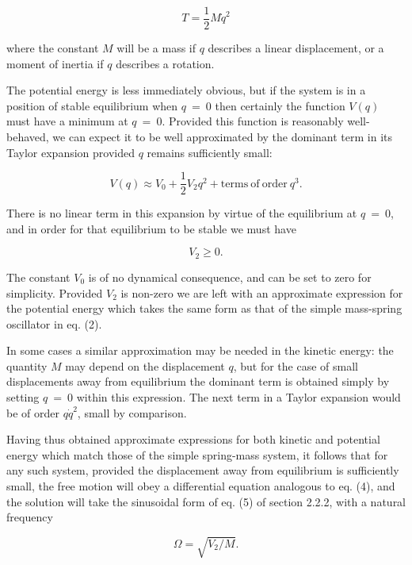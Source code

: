   $$T=\frac{1}{2} M \dot{q}^2 \tag{5}$$ 

  where the constant $M$ will be a mass if $q$ describes a linear displacement, 
  or a moment of inertia if $q$ describes a rotation. 

  The potential energy is less immediately obvious, but if the system is in a 
  position of stable equilibrium when $q~=~0$ then certainly the function 
  $V(q)$ must have a minimum at $q~=~0$. Provided this function is reasonably 
  well-behaved, we can expect it to be well approximated by the dominant term 
  in its Taylor expansion provided $q$ remains sufficiently small: 

  $$V(q) \approx V_0+\frac{1}{2} V_2 q^2 + \mathrm{terms~of~order~} q^3. 
  \tag{6} $$ 

  There is no linear term in this expansion by virtue of the equilibrium at 
  $q~=~0$, and in order for that equilibrium to be stable we must have 

  $$V_2 \ge 0. \tag{7} $$ 

  The constant $V_0$ is of no dynamical consequence, and can be set to zero for 
  simplicity. Provided $V_2$ is non-zero we are left with an approximate 
  expression for the potential energy which takes the same form as that of the 
  simple mass-spring oscillator in eq. (2). 

  In some cases a similar approximation may be needed in the kinetic energy: 
  the quantity $M$ may depend on the displacement $q$, but for the case of 
  small displacements away from equilibrium the dominant term is obtained 
  simply by setting $q~=~0$ within this expression. The next term in a Taylor 
  expansion would be of order $q\dot{q}^2$, small by comparison. 

  Having thus obtained approximate expressions for both kinetic and potential 
  energy which match those of the simple spring-mass system, it follows that 
  for any such system, provided the displacement away from equilibrium is 
  sufficiently small, the free motion will obey a differential equation 
  analogous to eq. (4), and the solution will take the sinusoidal form of eq. 
  (5) of section 2.2.2, with a natural frequency 

  $$\Omega=\sqrt{V_2/M}. \tag{8} $$ 